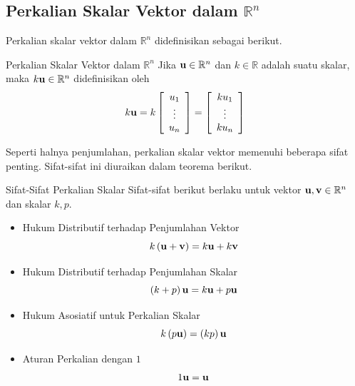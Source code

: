\subsection{Perkalian Skalar Vektor dalam \texorpdfstring{$\mathbb{R}^n$}{Rn}}

Perkalian skalar vektor dalam $\mathbb{R}^n$ didefinisikan sebagai 
berikut.

\begin{definition}{Perkalian Skalar Vektor dalam $\mathbb{R}^n$}\label{def:vectorscalarmultiplication}
Jika $\mathbf{u}\in \mathbb{R}^{n}$ dan $k\in \mathbb{R}$ adalah suatu
skalar,
 maka $k\mathbf{u}\in \mathbb{R}^{n}$ didefinisikan oleh
\begin{equation*}
k\mathbf{u}=k\left[ \begin{array}{c}
u_{1} \\
\vdots \\
u_{n}
\end{array}
\right] = \left[ \begin{array}{c}
ku_{1} \\
\vdots \\
ku_{n}
\end{array}
\right]
\end{equation*}
\end{definition}

Seperti halnya penjumlahan, perkalian skalar vektor memenuhi beberapa sifat penting. Sifat-sifat ini
diuraikan dalam teorema berikut.

\begin{theorem}{Sifat-Sifat Perkalian Skalar}\label{thm:vectorscalarmult}
Sifat-sifat berikut berlaku untuk vektor $\mathbf{u},\mathbf{v}\in \mathbb{R}^{n}$ dan skalar $k,p $.
\begin{itemize}
\item Hukum Distributif terhadap Penjumlahan Vektor
\begin{equation*}
k \left( \mathbf{u}+\mathbf{v}\right) = k\mathbf{u}+ k\mathbf{v}
\end{equation*}
\item Hukum Distributif terhadap Penjumlahan Skalar
\begin{equation*}
\left( k + p  \right)\mathbf{u} = k \mathbf{u}+p \mathbf{u}
\end{equation*}
\item Hukum Asosiatif untuk Perkalian Skalar
\begin{equation*}
k \left( p \mathbf{u}\right) = \left(k p \right)\mathbf{u}
\end{equation*}
\item Aturan Perkalian dengan $1$
\begin{equation*}
1\mathbf{u}=\mathbf{u}
\end{equation*}
\end{itemize}
\end{theorem}

